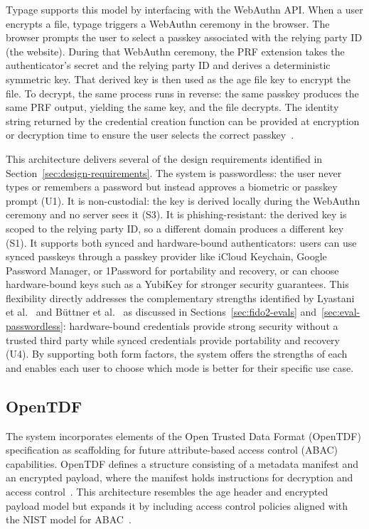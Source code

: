 Typage supports this model by interfacing with the WebAuthn API. When a user encrypts a file, typage triggers a WebAuthn ceremony in the browser. The browser prompts the user to select a passkey associated with the relying party ID (the website). During that WebAuthn ceremony, the PRF extension takes the authenticator's secret and the relying party ID and derives a deterministic symmetric key. That derived key is then used as the age file key to encrypt the file. To decrypt, the same process runs in reverse: the same passkey produces the same PRF output, yielding the same key, and the file decrypts. The identity string returned by the credential creation function can be provided at encryption or decryption time to ensure the user selects the correct passkey~\cite{typage_repo}.

This architecture delivers several of the design requirements identified in Section~\ref{sec:design-requirements}. The system is passwordless: the user never types or remembers a password but instead approves a biometric or passkey prompt (U1). It is non-custodial: the key is derived locally during the WebAuthn ceremony and no server sees it (S3). It is phishing-resistant: the derived key is scoped to the relying party ID, so a different domain produces a different key (S1). It supports both synced and hardware-bound authenticators: users can use synced passkeys through a passkey provider like iCloud Keychain, Google Password Manager, or 1Password for portability and recovery, or can choose hardware-bound keys such as a YubiKey for stronger security guarantees. This flexibility directly addresses the complementary strengths identified by Lyastani et al.~\cite{lyastani_fido2_2020} and B\"uttner et al.~\cite{buttner_passkey_2025} as discussed in Sections~\ref{sec:fido2-evals} and~\ref{sec:eval-passwordless}: hardware-bound credentials provide strong security without a trusted third party while synced credentials provide portability and recovery (U4). By supporting both form factors, the system offers the strengths of each and enables each user to choose which mode is better for their specific use case.

\subsection{OpenTDF}
\label{sec:opentdf}

The system incorporates elements of the Open Trusted Data Format (OpenTDF) specification as scaffolding for future attribute-based access control (ABAC) capabilities. OpenTDF defines a structure consisting of a metadata manifest and an encrypted payload, where the manifest holds instructions for decryption and access control~\cite{opentdf_spec}. This architecture resembles the age header and encrypted payload model but expands it by including access control policies aligned with the NIST model for ABAC~\cite{nist_abac}.

